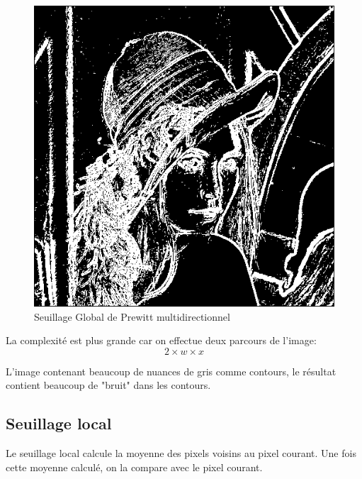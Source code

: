 \documentclass[11pt]{article}
\begin{document}
	\begin{figure}[H]
		\centering
		\includegraphics[scale=0.25]{Image/seuilGlobal.png}
		\caption{Seuillage Global de Prewitt multidirectionnel}
		\label{fig:seuilGlobal}
	\end{figure} 

	La complexité est plus grande car on effectue deux parcours de l’image: \[2 \times w \times x\]

	L’image contenant beaucoup de nuances de gris comme contours, le résultat contient beaucoup de "bruit" dans les contours.

	\subsection{Seuillage local}

	Le seuillage local calcule la moyenne des pixels voisins au pixel courant. 
	Une fois cette moyenne calculé, on la compare avec le pixel courant.
\end{document}
